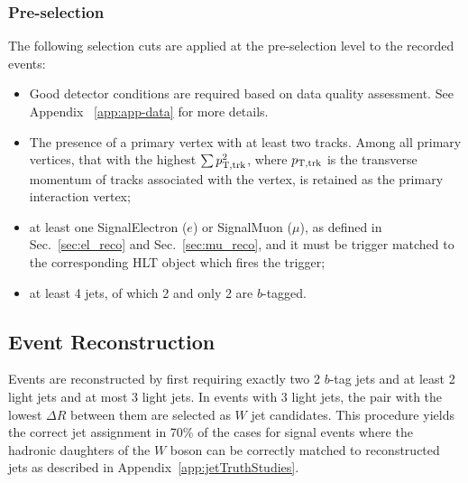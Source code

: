 \subsubsection{Pre-selection}
The following selection cuts are applied at the pre-selection level to the recorded events:
\begin{itemize}
\item Good detector conditions are required based on data quality assessment. See Appendix ~\ref{app:app-data} for more details.

\item The presence of a  primary vertex with at least two
  tracks. Among all primary vertices, that with the highest
	$\sum p_{{\rm T,trk}}^{2}$, where
	$p_{{\rm T,trk}}$ is the transverse momentum of tracks
	associated with the vertex, is retained as the primary
  interaction vertex;
\item at least one SignalElectron ($e$) or SignalMuon ($\mu$), as defined in Sec.~\ref{sec:el_reco} and Sec.~\ref{sec:mu_reco}, and it must be trigger matched to the 
corresponding HLT object which fires the trigger;
\item at least 4 jets, of which 2 and only 2 are $b$-tagged.
\end{itemize}

\subsection{Event Reconstruction}
\label{ssec:event_reco_res} 
Events are reconstructed by first requiring exactly two 2 $b$-tag jets and at least 2 light
jets and at most 3 light jets. In events with 3 light jets, the pair with the 
lowest $\Delta R$ between them are selected as $W$ jet candidates. This
procedure yields the correct jet assignment in 70\% of the cases for
signal events where the
hadronic daughters of the $W$ boson can be correctly matched to reconstructed
jets as described in Appendix~\ref{app:jetTruthStudies}.

